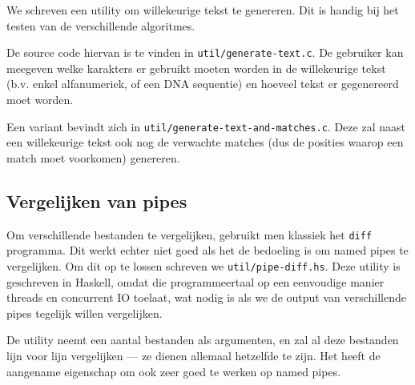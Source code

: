 \documentclass[a4paper,11pt]{article}
\begin{document}
We schreven een utility om willekeurige tekst te genereren. Dit is handig bij
het testen van de verschillende algoritmes.

De source code hiervan is te vinden in \verb#util/generate-text.c#. De gebruiker
kan meegeven welke karakters er gebruikt moeten worden in de willekeurige tekst
(b.v. enkel alfanumeriek, of een DNA sequentie) en hoeveel tekst er gegenereerd
moet worden.

\label{generate-text-and-matches}
Een variant bevindt zich in \verb#util/generate-text-and-matches.c#. Deze zal
naast een willekeurige tekst ook nog de verwachte matches (dus de posities
waarop een match moet voorkomen) genereren.

\subsection{Vergelijken van pipes}
\label{pipe-diff}

Om verschillende bestanden te vergelijken, gebruikt men klassiek het \verb#diff#
programma. Dit werkt echter niet goed als het de bedoeling is om named pipes
te vergelijken. Om dit op te lossen schreven we \verb#util/pipe-diff.hs#. Deze
utility is geschreven in Haskell, omdat die programmeertaal op een eenvoudige
manier threads en concurrent IO toelaat, wat nodig is als we de output van
verschillende pipes tegelijk willen vergelijken.

De utility neemt een aantal bestanden als argumenten, en zal al deze bestanden
lijn voor lijn vergelijken — ze dienen allemaal hetzelfde te zijn. Het heeft de
aangename eigenschap om ook zeer goed te werken op named pipes.
\end{document}
